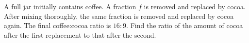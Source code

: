 A full jar initially contains coffee. A fraction $f$ is removed and replaced by cocoa. After mixing thoroughly, the same fraction is removed and replaced by cocoa again. The final coffee:cocoa ratio is $16:9$. Find the ratio of the amount of cocoa after the first replacement to that after the second.
